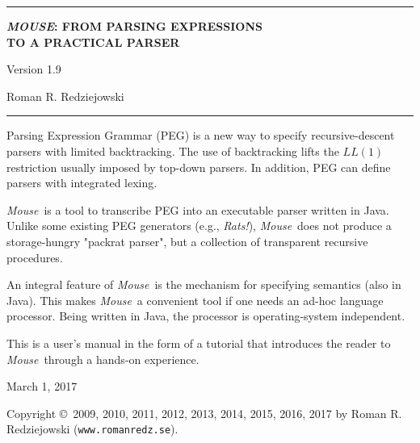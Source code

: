 \documentclass[a4paper,fleqn]{article}
\newcommand{\Version}{1.9}
\newcommand{\Mouse}{\textsl{Mouse}}
\newcommand{\tx}[1]{\texttt{#1}}
\begin{document}
\selectfont

\pagestyle{empty}
\begin{center}
\rule{\linewidth-20mm}{.5mm}

\bigskip
\Large \textbf{\textit{MOUSE}: FROM PARSING EXPRESSIONS\\TO A PRACTICAL PARSER}

\bigskip
\Large Version \Version

\bigskip
\Large Roman R. Redziejowski
\rule{\linewidth-20mm}{.5mm}




\normalsize
\parbox{0.875\linewidth}{
\noindent
Parsing Expression Grammar (PEG) is a new way to specify
recursive-descent parsers with limited backtracking.
The use of backtracking lifts the $LL(1)$ restriction usually imposed
by top-down parsers.
In addition, PEG can define parsers with integrated lexing.

\medskip
\noindent
\Mouse\ is a tool to transcribe PEG into an executable parser written in Java.
Unlike some existing PEG generators (e.g., \textsl{Rats!}), \Mouse\
does not produce a storage-hungry "packrat parser",
but a collection of transparent recursive procedures.

\medskip
\noindent
An integral feature of \Mouse\ is the mechanism for specifying
semantics (also in Java).
This makes \Mouse\ a convenient tool if one needs an ad-hoc language processor.
Being written in Java, the processor is operating-system independent.

\medskip
\noindent
This is a user's manual in the form of a tutorial
that introduces the reader to \Mouse\ through 
a hands-on experience.}
\end{center}

\begin{center}
March 1, 2017

\end{center}
\newpage


\noindent
Copyright \copyright\ 2009, 2010, 2011, 2012, 2013, 2014, 2015, 2016, 2017 by Roman R. Redziejowski (\tx{www.romanredz.se}).
\end{document}
